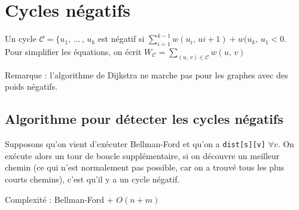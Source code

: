 \chapter{Cycles négatifs}

\begin{definition}
Un cycle $\mathcal{C} = \lbrace u_{1},\, ...\, ,\, u_{k}$ est négatif si $\sum\limits_{i = 1}^{k - 1} w(u_{i},\, u{i+1}) + w(u_{k},\, u_{1} < 0$. Pour simplifier les équations, on écrit $W_{\mathcal{C}} = \sum\limits_{(u,\, v) \in \mathcal{C}} w(u,\, v)$
\end{definition}

\textcolor{ocre}{Remarque} : l'algorithme de Dijkstra ne marche pas pour les graphes avec des poids négatifs.

\section{Algorithme pour détecter les cycles négatifs}

Supposons qu'on vient d'exécuter Bellman-Ford et qu'on a \texttt{dist[s][v]} $\forall v$. On exécute alors un tour de boucle supplémentaire, si on découvre un meilleur chemin (ce qui n'est normalement pas possible, car on a trouvé tous les plus courts chemins), c'est qu'il y a un cycle négatif.



Complexité : Bellman-Ford + $O(n + m)$
